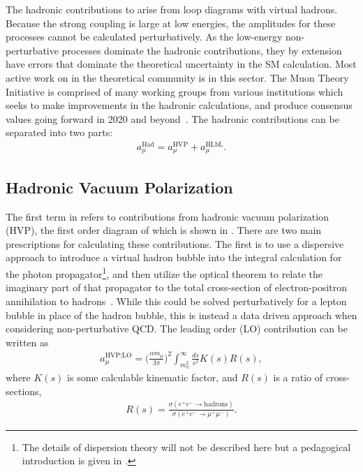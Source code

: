 The hadronic contributions to \amu arise from loop diagrams with virtual hadrons. Because the strong coupling is large at low energies, the amplitudes for these processes cannot be calculated perturbatively. As the low-energy non-perturbative processes dominate the hadronic contributions, they by extension have errors that dominate the theoretical uncertainty in the SM calculation. Most active work on \amu in the theoretical community is in this sector. The Muon \gmtwo Theory Initiative is comprised of many working groups from various institutions which seeks to make improvements in the hadronic calculations, and produce consensus values going forward in 2020 and beyond~\cite{TheoryInitiative}. The hadronic contributions can be separated into two parts:
		\begin{align}
            a_{\mu}^{\text{Had}} = a_{\mu}^{\text{HVP}} + a_{\mu}^{\text{HLbL}}.
        \label{eq:HadSplit}
		\end{align}


\subsection*{Hadronic Vacuum Polarization}
\label{subsec:HVP}

The first term in  refers to contributions from hadronic vacuum polarization (HVP), the first order diagram of which is shown in . There are two main prescriptions for calculating these contributions. The first is to use a dispersive approach to introduce a virtual hadron bubble into the integral calculation for the photon propagator\footnote{The details of dispersion theory will not be described here but a pedagogical introduction is given in .}, and then utilize the optical theorem to relate the imaginary part of that propagator to the total cross-section of electron-positron annihilation to hadrons~\cite{Jeger}. While this could be solved perturbatively for a lepton bubble in place of the hadron bubble, this is instead a data driven approach when considering non-perturbative QCD. The leading order (LO) contribution can be written as 
		\begin{align}
            a_{\mu}^{\text{HVP;LO}} = \Big(\frac{\alpha m_{\mu}}{3\pi}\Big)^{2} \int_{m_{\pi}^{2}}^{\infty} \frac{ds}{s^{2}} K(s) R(s),
		\end{align}
where $K(s)$ is some calculable kinematic factor, and $R(s)$ is a ratio of cross-sections,
		\begin{align} \label{eq:Rcrosssection}
            R(s) = \frac{\sigma(e^{+}e^{-} \rightarrow \text{hadrons})}{\sigma(e^{+}e^{-} \rightarrow \mu^{+}\mu^{-})}.
		\end{align}


